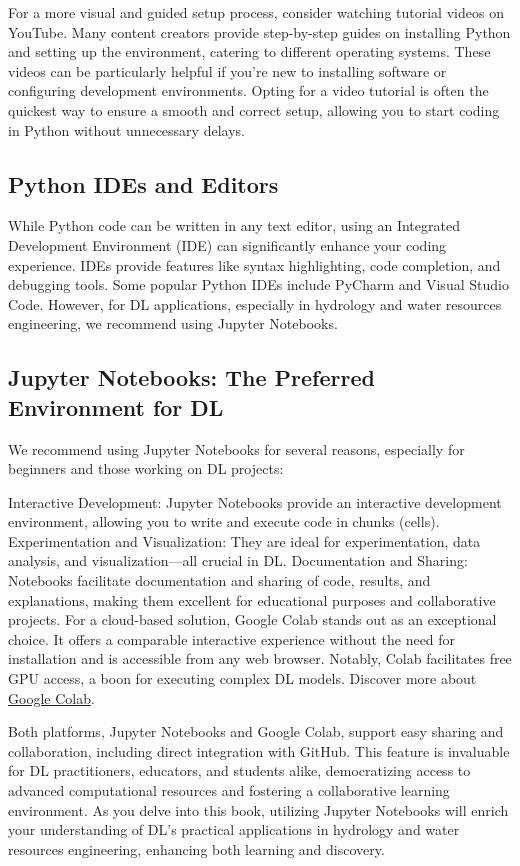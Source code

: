 For a more visual and guided setup process, consider watching tutorial videos on YouTube. Many content creators provide step-by-step guides on installing Python and setting up the environment, catering to different operating systems. These videos can be particularly helpful if you're new to installing software or configuring development environments. Opting for a video tutorial is often the quickest way to ensure a smooth and correct setup, allowing you to start coding in Python without unnecessary delays.

\subsection{Python IDEs and Editors}
While Python code can be written in any text editor, using an Integrated Development Environment (IDE) can significantly enhance your coding experience. IDEs provide features like syntax highlighting, code completion, and debugging tools. Some popular Python IDEs include PyCharm and Visual Studio Code. However, for DL applications, especially in hydrology and water resources engineering, we recommend using Jupyter Notebooks.

\subsection{Jupyter Notebooks: The Preferred Environment for DL}
We recommend using Jupyter Notebooks for several reasons, especially for beginners and those working on DL projects:

Interactive Development: Jupyter Notebooks provide an interactive development environment, allowing you to write and execute code in chunks (cells).
Experimentation and Visualization: They are ideal for experimentation, data analysis, and visualization—all crucial in DL.
Documentation and Sharing: Notebooks facilitate documentation and sharing of code, results, and explanations, making them excellent for educational purposes and collaborative projects.
For a cloud-based solution, Google Colab stands out as an exceptional choice. It offers a comparable interactive experience without the need for installation and is accessible from any web browser. Notably, Colab facilitates free GPU access, a boon for executing complex DL models. Discover more about \href{https://colab.research.google.com}{Google Colab}.

Both platforms, Jupyter Notebooks and Google Colab, support easy sharing and collaboration, including direct integration with GitHub. This feature is invaluable for DL practitioners, educators, and students alike, democratizing access to advanced computational resources and fostering a collaborative learning environment. As you delve into this book, utilizing Jupyter Notebooks will enrich your understanding of DL's practical applications in hydrology and water resources engineering, enhancing both learning and discovery.

